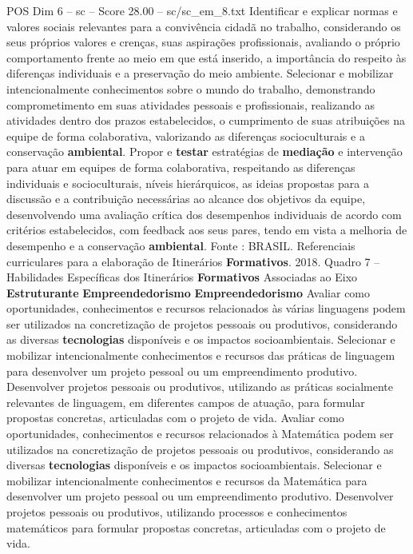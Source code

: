 \begin{textsample}{POS Dim 6 – sc – Score 28.00 – sc/sc\_em\_8.txt}
Identificar e explicar normas e valores sociais relevantes para a convivência cidadã no trabalho, considerando os seus próprios valores e crenças, suas aspirações profissionais, avaliando o próprio comportamento frente ao meio em que está inserido, a importância do respeito às diferenças individuais e a preservação do meio ambiente.
Selecionar e mobilizar intencionalmente conhecimentos sobre o mundo do trabalho, demonstrando comprometimento em suas atividades pessoais e profissionais, realizando as atividades dentro dos prazos estabelecidos, o cumprimento de suas atribuições na equipe de forma colaborativa, valorizando as diferenças socioculturais e a conservação \textbf{ambiental}.
Propor e \textbf{testar} estratégias de \textbf{mediação} e intervenção para atuar em equipes de forma colaborativa, respeitando as diferenças individuais e socioculturais, níveis hierárquicos, as ideias propostas para a discussão e a contribuição necessárias ao alcance dos objetivos da equipe, desenvolvendo uma avaliação crítica dos desempenhos individuais de acordo com critérios estabelecidos, com feedback aos seus pares, tendo em vista a melhoria de desempenho e a conservação \textbf{ambiental}.
Fonte : BRASIL.
Referenciais curriculares para a elaboração de Itinerários \textbf{Formativos}. 2018.
Quadro 7 – Habilidades Específicas dos Itinerários \textbf{Formativos} Associadas ao Eixo \textbf{Estruturante} \textbf{Empreendedorismo} \textbf{Empreendedorismo} Avaliar como oportunidades, conhecimentos e recursos relacionados às várias linguagens podem ser utilizados na concretização de projetos pessoais ou produtivos, considerando as diversas \textbf{tecnologias} disponíveis e os impactos socioambientais.
Selecionar e mobilizar intencionalmente conhecimentos e recursos das práticas de linguagem para desenvolver um projeto pessoal ou um empreendimento produtivo.
Desenvolver projetos pessoais ou produtivos, utilizando as práticas socialmente relevantes de linguagem, em diferentes campos de atuação, para formular propostas concretas, articuladas com o projeto de vida.
Avaliar como oportunidades, conhecimentos e recursos relacionados à Matemática podem ser utilizados na concretização de projetos pessoais ou produtivos, considerando as diversas \textbf{tecnologias} disponíveis e os impactos socioambientais.
Selecionar e mobilizar intencionalmente conhecimentos e recursos da Matemática para desenvolver um projeto pessoal ou um empreendimento produtivo.
Desenvolver projetos pessoais ou produtivos, utilizando processos e conhecimentos matemáticos para formular propostas concretas, articuladas com o projeto de vida.

\end{textsample}
